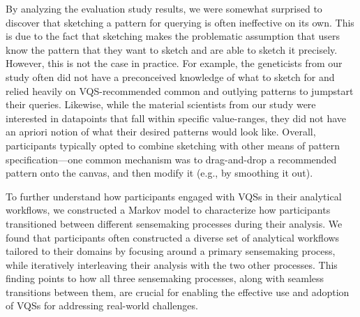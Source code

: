  \par By analyzing the evaluation study results, we were somewhat surprised to discover that sketching a pattern for querying is often ineffective on its own. This is due to the fact that sketching makes the problematic assumption that users know the pattern that they want to sketch and are able to sketch it precisely. However, this is not the case in practice. For example, the geneticists from our study often did not have a preconceived knowledge of what to sketch for and relied heavily on VQS-recommended common and outlying patterns to jumpstart their queries. Likewise, while the material scientists from our study were interested in datapoints that fall within specific value-ranges, they did not have an apriori notion of what their desired patterns would look like. Overall, participants typically opted to combine sketching with other means of pattern specification---one common mechanism was to drag-and-drop a recommended pattern onto the canvas, and then modify it (e.g., by smoothing it out). %
 \par To further understand how participants engaged with VQSs in their analytical workflows, we constructed a Markov model to characterize how participants transitioned between different sensemaking processes during their analysis. We found that participants often constructed a diverse set of analytical workflows tailored to their domains by focusing around a primary sensemaking process, while iteratively interleaving their analysis with the two other processes. This finding points to how all three sensemaking processes, along with seamless transitions between them, are crucial for enabling the effective use and adoption of VQSs for addressing real-world challenges.%
